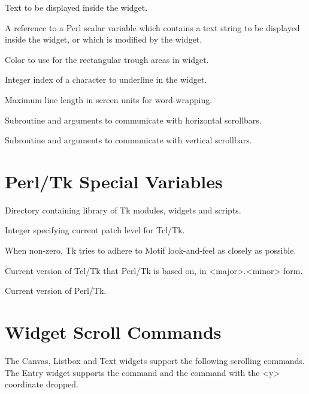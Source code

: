 \begin{enum}{1cm}
Text to be displayed inside the  widget.

A reference to a Perl scalar variable which contains a text string to be displayed inside
the widget, or which is modified by the widget.

Color to use for the rectangular trough areas in widget.

Integer  index  of  a  character to underline in the widget.

Maximum  line  length in screen units for word-wrapping.

Subroutine and arguments to communicate with horizontal scrollbars.

Subroutine and arguments to communicate with vertical scrollbars.

\end{enum}

\section{Perl/Tk Special Variables}

\begin{enum}{1cm}
 
Directory containing library of Tk modules, widgets and scripts.

Integer specifying current patch level for Tcl/Tk.

When non-zero, Tk tries to adhere to Motif look-and-feel as closely
as possible.

Current version of Tcl/Tk that Perl/Tk is based on, in <major>.<minor> form.

Current version of Perl/Tk.

\end{enum}

\section{Widget Scroll Commands}

The Canvas, Listbox and Text widgets support the following scrolling commands.
The Entry widget supports the  command and the  command 
with the <y> coordinate dropped.

